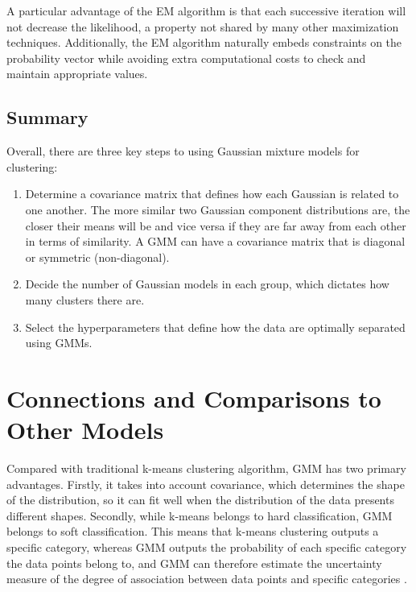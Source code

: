 \documentclass[12pt]{article}
\begin{document}
A particular advantage of the EM algorithm is that each successive
iteration will not decrease the likelihood, a property not shared by
many other maximization techniques. Additionally, the EM algorithm
naturally embeds constraints on the probability vector while avoiding
extra computational costs to check and maintain appropriate values.

\hypertarget{summary}{%
\subsection{Summary}\label{summary}}

Overall, there are three key steps to using Gaussian mixture models for
clustering:

\begin{enumerate}
\def\labelenumi{\arabic{enumi}.}
\item
  Determine a covariance matrix that defines how each Gaussian is
  related to one another. The more similar two Gaussian component
  distributions are, the closer their means will be and vice versa if
  they are far away from each other in terms of similarity. A GMM can
  have a covariance matrix that is diagonal or symmetric (non-diagonal).
\item
  Decide the number of Gaussian models in each group, which dictates how
  many clusters there are.
\item
  Select the hyperparameters that define how the data are optimally
  separated using GMMs.
\end{enumerate}

\hypertarget{connections-and-comparisons-to-other-models}{%
\section{Connections and Comparisons to Other
Models}\label{connections-and-comparisons-to-other-models}}

\label{sec:compare}

Compared with traditional k-means clustering algorithm, GMM has two
primary advantages. Firstly, it takes into account covariance, which
determines the shape of the distribution, so it can fit well when the
distribution of the data presents different shapes. Secondly, while
k-means belongs to hard classification, GMM belongs to soft
classification. This means that k-means clustering outputs a specific
category, whereas GMM outputs the probability of each specific category
the data points belong to, and GMM can therefore estimate the
uncertainty measure of the degree of association between data points and
specific categories \citep{huang2023gaussian}.
\end{document}
